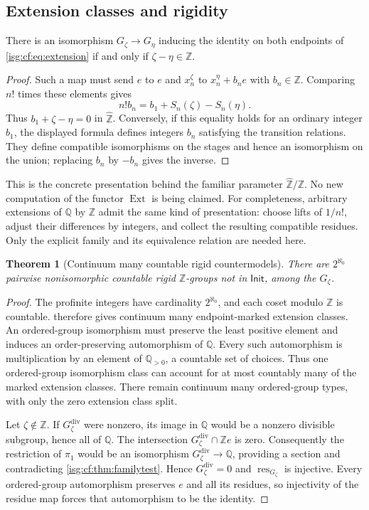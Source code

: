\documentclass[11pt]{article}
\newtheorem{theorem}{Theorem}[section]
\theoremstyle{definition}
\theoremstyle{remark}
\newcommand{\Z}{\mathbb{Z}}
\newcommand{\Q}{\mathbb{Q}}
\newcommand{\Zhat}{\widehat{\Z}}
\newcommand{\IR}{\mathsf{Init}}
\newcommand{\res}{\operatorname{res}}
\newcommand{\Ext}{\operatorname{Ext}}
\newcommand{\dv}{\mathrm{div}}
\begin{document}
\subsection{Extension classes and rigidity}
\begin{proposition}\label{isg:cf:prop:extensionclasses}
There is an isomorphism $G_\zeta\to G_\eta$ inducing the identity on
both endpoints of \eqref{isg:cf:eq:extension} if and only if
$\zeta-\eta\in\Z$.
\end{proposition}
\begin{proof}
Such a map must send $e$ to $e$ and $x_n^\zeta$ to
$x_n^\eta+b_ne$ with $b_n\in\Z$. Comparing $n!$ times these elements
gives
\[
 n!b_n=b_1+S_n(\zeta)-S_n(\eta).
\]
Thus $b_1+\zeta-\eta=0$ in $\Zhat$. Conversely, if this equality
holds for an ordinary integer $b_1$, the displayed formula defines
integers $b_n$ satisfying the transition relations. They define compatible
isomorphisms on the stages and hence an isomorphism on the union;
replacing $b_n$ by $-b_n$ gives the inverse.
\end{proof}

This is the concrete presentation behind the familiar parameter
$\Zhat/\Z$. No new computation of the functor $\Ext$ is being claimed.
For completeness, arbitrary extensions of $\Q$ by $\Z$ admit the same
kind of presentation: choose lifts of $1/n!$, adjust their differences
by integers, and collect the resulting compatible residues. Only the
explicit family and its equivalence relation are needed here.

\begin{theorem}[Continuum many countable rigid countermodels]\label{isg:cf:thm:continuum}
There are $2^{\aleph_0}$ pairwise nonisomorphic countable rigid
$\Z$-groups not in $\IR$, among the $G_\zeta$.
\end{theorem}
\begin{proof}
The profinite integers have cardinality $2^{\aleph_0}$, and each coset
modulo $\Z$ is countable.  therefore
gives continuum many endpoint-marked extension classes. An ordered-group
isomorphism must preserve the least positive element and induces an
order-preserving automorphism of $\Q$. Every such automorphism is
multiplication by an element of $\Q_{>0}$, a countable set of choices.
Thus one ordered-group isomorphism class can account for at most
countably many of the marked extension classes. There remain continuum
many ordered-group types, with only the zero extension class split.

Let $\zeta\notin\Z$. If $G_\zeta^{\dv}$ were nonzero, its image in
$\Q$ would be a nonzero divisible subgroup, hence all of $\Q$.
The intersection $G_\zeta^{\dv}\cap\Z e$ is zero. Consequently the
restriction of $\pi_1$ would be an isomorphism $G_\zeta^{\dv}\to\Q$,
providing a section and contradicting \cref{isg:cf:thm:familytest}.
Hence $G_\zeta^{\dv}=0$ and $\res_{G_\zeta}$ is injective.
Every ordered-group automorphism preserves $e$ and all its residues,
so injectivity of the residue map forces that automorphism to be the
identity.
\end{proof}
\end{document}
